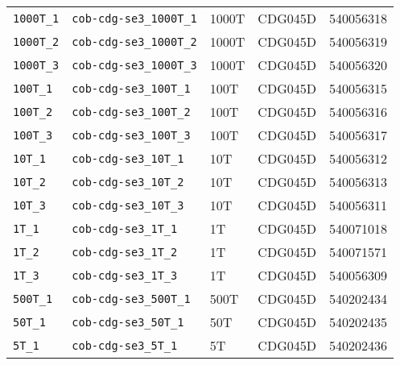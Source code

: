 \begin{tabular}{ l l l l l }
\verb|1000T_1|&\verb|cob-cdg-se3_1000T_1|&1000T&CDG045D&540056318\\
\verb|1000T_2|&\verb|cob-cdg-se3_1000T_2|&1000T&CDG045D&540056319\\
\verb|1000T_3|&\verb|cob-cdg-se3_1000T_3|&1000T&CDG045D&540056320\\
\verb|100T_1|&\verb|cob-cdg-se3_100T_1|&100T&CDG045D&540056315\\
\verb|100T_2|&\verb|cob-cdg-se3_100T_2|&100T&CDG045D&540056316\\
\verb|100T_3|&\verb|cob-cdg-se3_100T_3|&100T&CDG045D&540056317\\
\verb|10T_1|&\verb|cob-cdg-se3_10T_1|&10T&CDG045D&540056312\\
\verb|10T_2|&\verb|cob-cdg-se3_10T_2|&10T&CDG045D&540056313\\
\verb|10T_3|&\verb|cob-cdg-se3_10T_3|&10T&CDG045D&540056311\\
\verb|1T_1|&\verb|cob-cdg-se3_1T_1|&1T&CDG045D&540071018\\
\verb|1T_2|&\verb|cob-cdg-se3_1T_2|&1T&CDG045D&540071571\\
\verb|1T_3|&\verb|cob-cdg-se3_1T_3|&1T&CDG045D&540056309\\
\verb|500T_1|&\verb|cob-cdg-se3_500T_1|&500T&CDG045D&540202434\\
\verb|50T_1|&\verb|cob-cdg-se3_50T_1|&50T&CDG045D&540202435\\
\verb|5T_1|&\verb|cob-cdg-se3_5T_1|&5T&CDG045D&540202436\\
\end{tabular}
